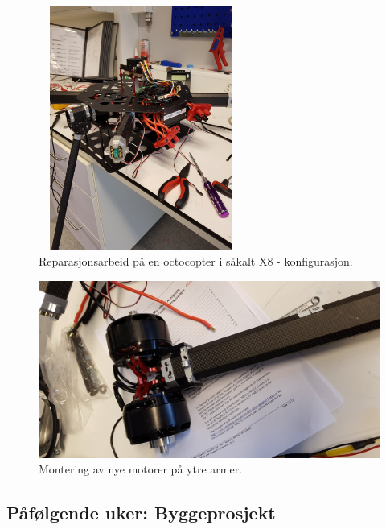 \documentclass[12pt, a4paper]{report}
\begin{document}
\begin{figure}[ht]
	\centering
	\includegraphics[height = 8cm, width = 0.6\textwidth]{bilder/octocopt_x8.jpg}
	\caption{Reparasjonsarbeid på en octocopter i såkalt X8 - konfigurasjon.}
\end{figure}
\begin{figure}[ht]
	\centering
	\includegraphics[scale=.2]{bilder/octarm_x8.jpg}
	\caption{Montering av nye motorer på ytre armer.}
\end{figure}

\subsection{Påfølgende uker: Byggeprosjekt}
\end{document}
